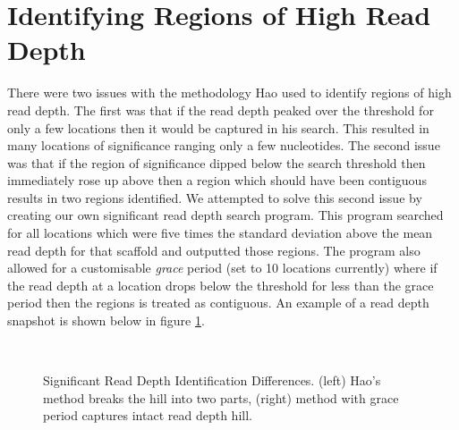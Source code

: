 \documentclass[12pt]{article}
\begin{document}
\section{Identifying Regions of High Read Depth}
\vspace{-0.5cm}
	There were two issues with the methodology Hao used to identify regions of high read depth. The first was that if the read depth peaked over the threshold for only a few locations then it would be captured in his search. This resulted in many locations of significance ranging only a few nucleotides. The second issue was that if the region of significance dipped below the search threshold then immediately rose up above then a region which should have been contiguous results in two regions identified. We attempted to solve this second issue by creating our own significant read depth search program. This program searched for all locations which were five times the standard deviation above the mean read depth for that scaffold and outputted those regions. The program also allowed for a customisable \textit{grace} period (set to 10 locations currently) where if the read depth at a location drops below the threshold for less than the grace period then the regions is treated as contiguous. An example of a read depth snapshot is shown below in figure \ref{rdsnpstdevgrace}.
\begin{figure}[H]
	\begin{centering}
		\\
		\begin{singlespace}
			\vspace{-0.5cm}
			\caption[Significant Read Depth Identification Differences.]{Significant Read Depth Identification Differences. (left) Hao's method breaks the hill into two parts, (right) method with grace period captures intact read depth hill.}\label{rdsnpstdevgrace}
		\end{singlespace}
	\end{centering}
\end{figure}

%
%
\vspace{-0.5cm}
\end{document}
